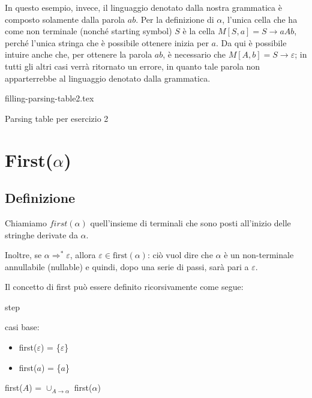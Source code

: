 \documentclass[class=book, crop=false, oneside, 12pt]{standalone}
\begin{document}
In questo esempio, invece, il linguaggio denotato dalla nostra grammatica è composto solamente dalla parola \(ab\). Per la definizione di \(\alpha\), l'unica cella che ha come non terminale (nonché starting symbol) \(S\) è la cella \(M[S, a] = S \rightarrow aAb\), perché l'unica stringa che è possibile ottenere inizia per \(a\). Da qui è possibile intuire anche che, per ottenere la parola \(ab\), è necessario che \(M[A, b] = S \rightarrow \varepsilon\); in tutti gli altri casi verrà ritornato un errore, in quanto tale parola non apparterrebbe al linguaggio denotato dalla grammatica. 

\begin{table}[H]
	\centering
	{filling-parsing-table2.tex}
    \caption{Parsing table per esercizio 2}
    \label{filling-parsing-table2}
\end{table}

\section{First(\(\alpha\))}
\subsection{Definizione}
\begin{definition}
    Chiamiamo \(first(\alpha)\) quell'insieme di terminali che sono posti all'inizio delle stringhe derivate da \(\alpha\).
    
    Inoltre, se \(\alpha \Rightarrow^* \varepsilon\), allora \(\varepsilon \in \textrm{first}(\alpha)\): ciò vuol dire che \(\alpha\) è un non-terminale annullabile (nullable) e quindi, dopo una serie di passi, sarà pari a \(\varepsilon\).
\end{definition}

Il concetto di first può essere definito ricorsivamente come segue:

\begin{labeling}{step}
    \item[base] casi base:
    \begin{itemize}
        \item first(\(\varepsilon\)) = \{\(\varepsilon\)\}
        \item first(\(a\)) = \{\(a\)\}
    \end{itemize}
    \item[step] first(\(A\)) = \(\cup_{A \rightarrow \alpha}\) first(\(\alpha\))
\end{labeling}
\end{document}
